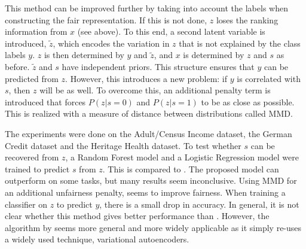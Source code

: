 This method can be improved further by taking into account the labels
when constructing the fair representation.
If this is not done, \(z\) loses the ranking information from \(x\) (see \citet{feldman2015certifying} above).
To this end, a second latent variable is introduced, \(\tilde{z}\),
which encodes the variation in \(z\) that is not explained by the class labels \(y\).
\(z\) is then determined by \(y\) and \(\tilde{z}\),
and \(x\) is determined by \(z\) and \(s\) as before.
\(\tilde{z}\) and \(s\) have independent priors.
This structure ensures that \(y\) can be predicted from \(z\).
However, this introduces a new problem:
if \(y\) is correlated with \(s\), then \(z\) will be as well.
To overcome this, an additional penalty term is introduced that forces \(P(z|s=0)\)
and \(P(z|s=1)\) to be as close as possible.
This is realized with a measure of distance between distributions called \acf{MMD}.

The experiments were done on the Adult/Census Income dataset,
the German Credit dataset and the Heritage Health dataset.
To test whether \(s\) can be recovered from \(z\),
a Random Forest model and a Logistic Regression model were trained to predict \(s\) from \(z\).
This is compared to \citet{zemel2013learning}.
The proposed model can outperform \citet{zemel2013learning} on some tasks, but many results seem inconclusive.
Using \ac{MMD} for an additional unfairness penalty, seems to improve fairness.
When training a classifier on \(z\) to predict \(y\), there is a small drop in accuracy.
In general, it is not clear whether this method gives better performance than \citet{feldman2015certifying}.
However, the algorithm by \citet{louizos2016variational} seems more general and more widely applicable
as it simply re-uses a widely used technique, variational autoencoders.

